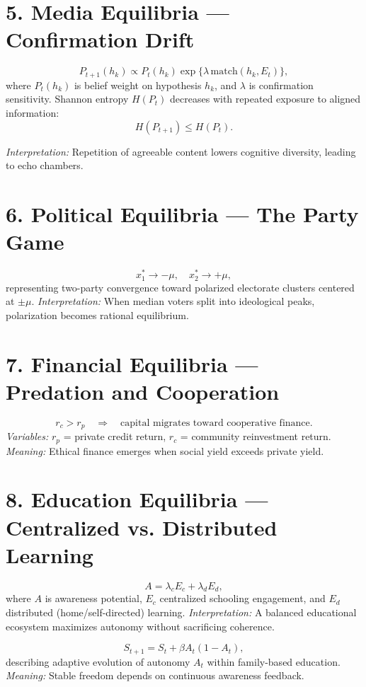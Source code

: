 \documentclass[12pt,twoside]{book}
\begin{document}
\section*{5. Media Equilibria — Confirmation Drift}
\[
P_{t+1}(h_k)\propto P_t(h_k)\exp\{\lambda\,\text{match}(h_k,E_t)\},
\]
where \(P_t(h_k)\) is belief weight on hypothesis \(h_k\), and \(\lambda\) is confirmation sensitivity.  
Shannon entropy \(H(P_t)\) decreases with repeated exposure to aligned information:
\[
H(P_{t+1})\le H(P_t).
\]

\emph{Interpretation:} Repetition of agreeable content lowers cognitive diversity, leading to echo chambers.

\section*{6. Political Equilibria — The Party Game}
\[
x_1^*\to -\mu, \quad x_2^*\to +\mu,
\]
representing two-party convergence toward polarized electorate clusters centered at \(\pm \mu\).  
\emph{Interpretation:} When median voters split into ideological peaks, polarization becomes rational equilibrium.

\section*{7. Financial Equilibria — Predation and Cooperation}
\[
r_c > r_p \quad \Rightarrow \quad \text{capital migrates toward cooperative finance.}
\]
\emph{Variables:}  
\(r_p\) = private credit return, \(r_c\) = community reinvestment return.  
\emph{Meaning:} Ethical finance emerges when social yield exceeds private yield.

\section*{8. Education Equilibria — Centralized vs. Distributed Learning}
\[
A = \lambda_c E_c + \lambda_d E_d,
\]
where \(A\) is awareness potential, \(E_c\) centralized schooling engagement, and \(E_d\) distributed (home/self-directed) learning.  
\emph{Interpretation:} A balanced educational ecosystem maximizes autonomy without sacrificing coherence.

\[
S_{t+1} = S_t + \beta A_t(1-A_t),
\]
describing adaptive evolution of autonomy \(A_t\) within family-based education.  
\emph{Meaning:} Stable freedom depends on continuous awareness feedback.
\end{document}
